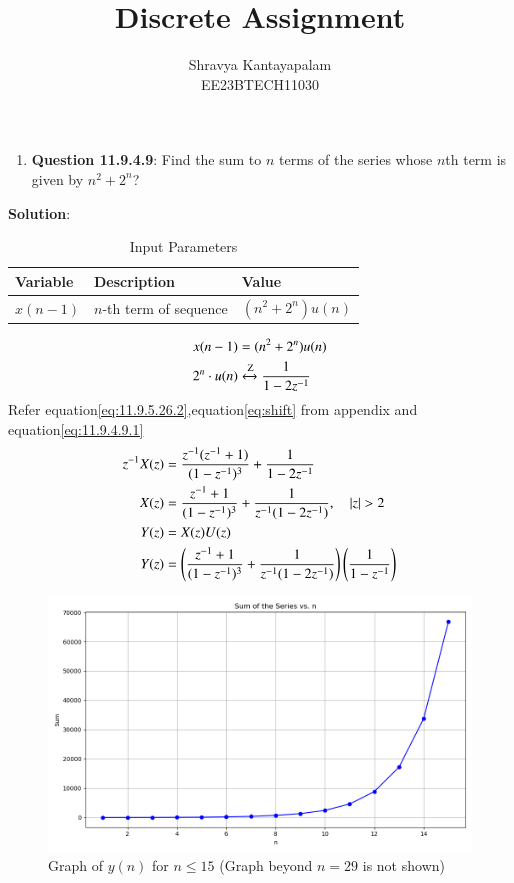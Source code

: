 \documentclass[a4,12pt,onecolumn]{IEEEtran}
\begin{document}
\title{Discrete Assignment}
\author{Shravya Kantayapalam\\ EE23BTECH11030}
\maketitle

\begin{enumerate}
    \item \textbf{Question 11.9.4.9}:
    Find the sum to $n$ terms of the series whose $n$th term is given by $n^2 + 2^n$?
 \end{enumerate}  
    \textbf{Solution}:
   

\begin{table}[htbp]
    \centering
    \caption{Input Parameters}
    \begin{tabular}{|l|l|l|}
    \hline
    \textbf{Variable} & \textbf{Description} & \textbf{Value} \\
    \hline
    \( x(n-1) \) & \( n \)-th term of sequence & \( (n^2 + 2^n)u(n) \) \\
    \hline
    \end{tabular}
\end{table}
\begin{align}
x(n-1)&=(n^2+2^n)u(n)\\
2^n \cdot u(n) &\xleftrightarrow{\text{Z}} \frac{1}{1 - 2z^{-1}} \label{eq:11.9.4.9.1}\\
\end{align}
Refer equation\eqref{eq:11.9.5.26.2},equation\eqref{eq:shift} from appendix and equation\eqref{eq:11.9.4.9.1}
\begin{align}
z^{-1}X(z)&=\frac{z^{-1}(z^{-1} + 1)}{(1-z^{-1})^3} +\frac{1}{1 - 2z^{-1}}\\
X(z)&=\frac{z^{-1} + 1}{(1 - z^{-1})^3}+\frac{1}{z^{-1}(1 - 2z^{-1})},\quad{|z|>2}\\
Y(z)&=X(z)U(z)\\
Y(z)&=\brak{\frac{z^{-1} + 1}{(1 - z^{-1})^3}+\frac{1}{z^{-1}(1 - 2z^{-1})}}\brak{\frac{1}{1-z^{-1}}}
\end{align}
\begin{figure}[ht]
    \centering
    \includegraphics[width=\columnwidth]{figs/main.png}
    \caption{Graph of $y(n)$ for $n \leq 15$ (Graph beyond $n = 29$ is not shown)}
    \label{fig:example}
\end{figure}
\end{document}
